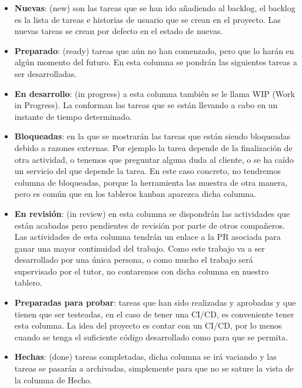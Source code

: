 \begin{itemize}
    \item \textbf{Nuevas}: (new) son las tareas que se han ido añadiendo al backlog, el backlog es la lista de tareas e historias de usuario que se crean en el proyecto. Las nuevas tareas se crean por defecto en el estado de nuevas. 
    
    \item \textbf{Preparado}: (ready) tareas que aún no han comenzado, pero que lo harán en algún momento del futuro. En esta columna se pondrán las siguientes tareas a ser desarrolladas. 
    
    \item \textbf{En desarrollo}: (in progress) a esta columna también se le llama WIP (Work in Progress). La conforman las tareas que se están llevando a cabo en un instante de tiempo determinado. 
    
    \item \textbf{Bloqueadas}: en la que se mostrarán las tareas que están siendo bloqueadas debido a razones externas. Por ejemplo la tarea depende de la finalización de otra actividad, o tenemos que preguntar alguna duda al cliente, o se ha caído un servicio del que depende la tarea. En este caso concreto, no tendremos columna de bloqueadas, porque la herramienta las muestra de otra manera, pero es común que en los tableros kanban aparezca dicha columna. 
    
    \item \textbf{En revisión}: (in review) en esta columna se dispondrán las actividades que están acabadas pero pendientes de revisión por parte de otros compañeros. Las actividades de esta columna tendrán un enlace a la PR asociada para ganar una mayor continuidad del trabajo. Como este trabajo va a ser desarrollado por una única persona, o como mucho el trabajo será supervisado por el tutor, no contaremos con dicha columna en nuestro tablero. 
    
    \item \textbf{Preparadas para probar}: tareas que han sido realizadas y aprobadas y que tienen que ser testeadas, en el caso de tener una CI/CD, es conveniente tener esta columna. La idea del proyecto es contar con un CI/CD, por lo menos cuando se tenga el suficiente código desarrollado como para que se permita. 
    
    \item \textbf{Hechas}: (done) tareas completadas, dicha columna se irá vaciando y las tareas se pasarán a archivadas, simplemente para que no se sature la vista de la columna de Hecho.
\end{itemize}

